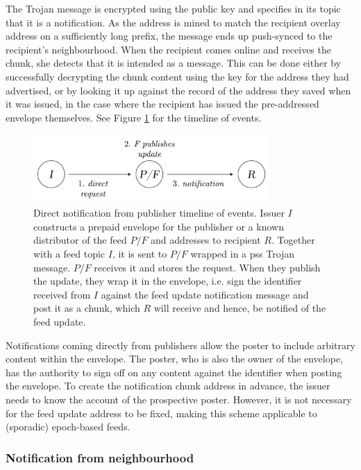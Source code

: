 The Trojan message is encrypted using the public key and specifies in its topic that it is a notification. As the address is mined to match the recipient overlay address on a sufficiently long prefix, the message ends up push-synced to the recipient's neighbourhood. When the recipient comes online and receives the chunk, she detects that it is intended as a message. This can be done either by successfully decrypting the chunk content using the key for the address they had advertised, or by looking it up against the record of the address they saved when it was issued, in the case where the recipient has issued the pre-addressed envelope themselves. See Figure \ref{fig:direct-notification-events} for the timeline of events.


\begin{figure}[htbp]
   \centering
    \includegraphics[width=0.8\textwidth]{fig/direct-notification-events.pdf}
   \caption[Direct notification from publisher timeline of events \statusgreen]{Direct notification from publisher timeline of events. Issuer $I$ constructs a prepaid envelope for the publisher or a known distributor of the feed $P/F$ and addresses to recipient $R$. Together with a feed topic $I$, it is sent to $P/F$ wrapped in a pss Trojan message. $P/F$ receives it and stores the request. When they publish the update, they wrap it in the envelope, i.e. sign the identifier received from $I$ against the feed update notification message and post it as a chunk, which $R$ will receive and hence, be notified of the feed update. }
   \label{fig:direct-notification-events}
\end{figure}


Notifications coming directly from publishers allow the poster to include arbitrary content within the envelope. The poster, who is also the owner of the envelope, has the authority to sign off on any content against the identifier when posting the envelope. To create the notification chunk address in advance, the issuer needs to know the account of the prospective poster. However, it is not necessary for the feed update address to be fixed, making this scheme applicable to (sporadic) epoch-based feeds.

\subsubsection{Notification from neighbourhood}

